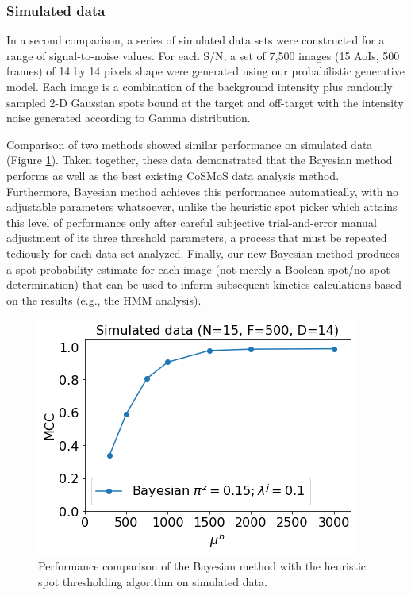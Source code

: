 \subsubsection{Simulated data}

In a second comparison, a series of simulated data sets were constructed for a range of signal-to-noise values. For each S/N, a set of 7,500 images (15 AoIs, 500 frames) of 14 by 14 pixels shape were generated using our probabilistic generative model. Each image is a combination of the background intensity plus randomly sampled 2-D Gaussian spots bound at the target and off-target with the intensity noise generated according to Gamma distribution.

Comparison of two methods showed similar performance on simulated data (Figure \ref{fig:simulated_data}). Taken together, these data demonstrated that the Bayesian method performs as well as the best existing CoSMoS data analysis method. Furthermore, Bayesian method achieves this performance automatically, with no adjustable parameters whatsoever, unlike the heuristic spot picker which attains this level of performance only after careful subjective trial-and-error manual adjustment of its three threshold parameters, a process that must be repeated tediously for each data set analyzed. Finally, our new Bayesian method produces a spot probability estimate for each image (not merely a Boolean spot/no spot determination) that can be used to inform subsequent kinetics calculations based on the results (e.g., the HMM analysis).

\begin{figure}
\includegraphics[width=\linewidth]{figures/figure5.png}
\caption{Performance comparison of the Bayesian method with the heuristic spot thresholding algorithm on simulated data.}
\label{fig:simulated_data}
\end{figure}

